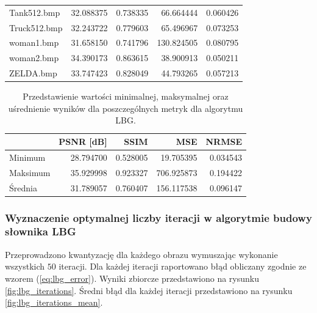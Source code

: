 \documentclass{article}
\begin{document}
\begin{table}[!ht]
\begin{tabular}{@{}lrrrr@{}}
    Tank512.bmp        & 32.088375     & 0.738335 & 66.664444  & 0.060426 \\
    Truck512.bmp       & 32.243722     & 0.779603 & 65.496967  & 0.073253 \\
    woman1.bmp         & 31.658150     & 0.741796 & 130.824505 & 0.080795 \\
    woman2.bmp         & 34.390173     & 0.863615 & 38.900913  & 0.050211 \\
    ZELDA.bmp          & 33.747423     & 0.828049 & 44.793265  & 0.057213 \\
    \bottomrule
  \end{tabular}
\end{table}

\begin{table}[H]
  \caption{Przedstawienie wartości minimalnej, maksymalnej oraz uśrednienie wyników dla poszczególnych metryk dla algorytmu LBG.}
  \label{tab:lbg_summary}
  \centering
  \begin{tabular}{@{}lrrrr@{}}
    \toprule
             & PSNR {[}dB{]} & SSIM     & MSE        & NRMSE    \\ \midrule
    Minimum  & 28.794700     & 0.528005 & 19.705395  & 0.034543 \\
    Maksimum & 35.929998     & 0.923327 & 706.925873 & 0.194422 \\
    Średnia  & 31.789057     & 0.760407 & 156.117538 & 0.096147 \\
    \bottomrule
  \end{tabular}
\end{table}

\subsubsection{Wyznaczenie optymalnej liczby iteracji w algorytmie budowy słownika LBG}

Przeprowadzono kwantyzację dla każdego obrazu wymuszając wykonanie wszystkich $50$ iteracji. Dla każdej iteracji raportowano błąd obliczany zgodnie ze wzorem (\ref{eq:lbg_error}). Wyniki zbiorcze przedstawiono na rysunku \ref{fig:lbg_iterations}. Średni błąd dla każdej iteracji przedstawiono na rysunku \ref{fig:lbg_iterations_mean}.
\end{document}
